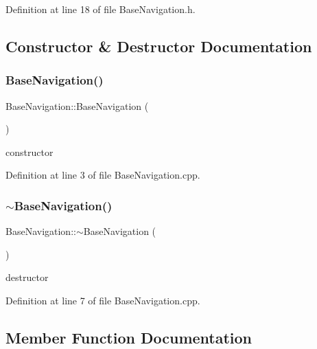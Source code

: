 Definition at line 18 of file Base\+Navigation.\+h.



\subsection{Constructor \& Destructor Documentation}
\mbox{\label{class_base_navigation_a157886375050e9d16d389a56ef215c47}} 
\subsubsection{\texorpdfstring{Base\+Navigation()}{BaseNavigation()}}
{\footnotesize\ttfamily Base\+Navigation\+::\+Base\+Navigation (\begin{DoxyParamCaption}{ }\end{DoxyParamCaption})}



constructor 



Definition at line 3 of file Base\+Navigation.\+cpp.

\mbox{\label{class_base_navigation_a8ab9ee34a57aefc6928d083884870c27}} 
\subsubsection{\texorpdfstring{$\sim$\+Base\+Navigation()}{~BaseNavigation()}}
{\footnotesize\ttfamily Base\+Navigation\+::$\sim$\+Base\+Navigation (\begin{DoxyParamCaption}{ }\end{DoxyParamCaption})}



destructor 



Definition at line 7 of file Base\+Navigation.\+cpp.



\subsection{Member Function Documentation}
\mbox{\label{class_base_navigation_ad447e31e0ee65180872344f2b2a294a8}} 
